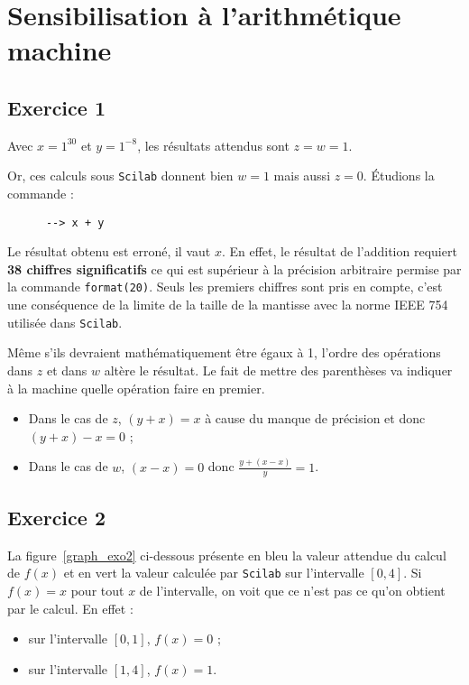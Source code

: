 \documentclass[a4paper,11pt]{article}
\theoremstyle{nonumberplain}
\begin{document}
\section{Sensibilisation à l'arithmétique machine}
\subsection*{Exercice 1}

    Avec $x = 1^{30}$ et $y = 1^{-8}$, les résultats attendus sont $z = w = 1$.

    Or, ces calculs sous \texttt{Scilab} donnent bien $w = 1$ mais aussi $z = 0$. \'{E}tudions la commande :
    \begin{verbatim}
      --> x + y
    \end{verbatim}
    Le résultat obtenu est erroné, il vaut $x$. En effet, le résultat de l'addition requiert \textbf{38 chiffres significatifs} ce qui est supérieur à la précision arbitraire permise par la commande \texttt{format(20)}.
    Seuls les premiers chiffres sont pris en compte, c'est une conséquence de la limite de la taille de la mantisse avec la norme IEEE 754 utilisée dans \texttt{Scilab}.
    \newline

    Même s'ils devraient mathématiquement être égaux à 1, l'ordre des opérations dans $z$ et dans $w$ altère le résultat.
    Le fait de mettre des parenthèses va indiquer à la machine quelle opération faire en premier.
    \begin{itemize}
        \item Dans le cas de $z$, $(y + x) = x$ à cause du manque de précision et donc $(y + x) - x = 0$ ;
        \item Dans le cas de $w$, $(x - x) = 0$ donc $\frac{y + (x -x)}{y} = 1$.
    \end{itemize}


\subsection*{Exercice 2}

    La figure~\ref{graph_exo2} ci-dessous présente en bleu la valeur attendue du calcul de $f(x)$ et en vert la valeur calculée par \texttt{Scilab} sur l'intervalle $[0, 4]$.
    Si $f(x) = x$ pour tout $x$ de l'intervalle, on voit que ce n'est pas ce qu'on obtient par le calcul. En effet :

    \begin{itemize}
        \item sur l'intervalle $[0, 1]$, $f(x) = 0$ ;
        \item sur l'intervalle $[1, 4]$, $f(x) = 1$.
    \end{itemize}~\newline
\end{document}
